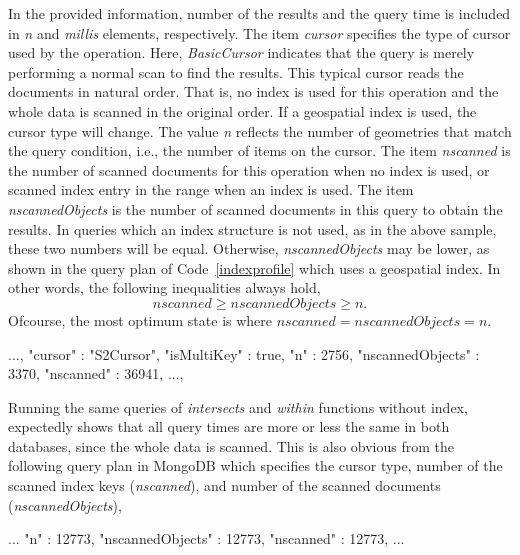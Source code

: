 \documentclass[a4paper,12pt]{article}
\begin{document}
In the provided information, number of the results and the query time is included in \textit{n} and \textit{millis} elements, respectively. The item \textit{cursor} specifies the type of cursor used by the operation. Here, \textit{BasicCursor} indicates that the query is merely performing a normal scan to find the results. This typical cursor reads the documents in natural order. That is, no index is used for this operation and the whole data is scanned in the original order. If a geospatial index is used, the cursor type will change. The value \textit{n} reflects the number of geometries that match the query condition, i.e., the number of items on the cursor. The item \textit{nscanned} is the number of scanned documents for this operation when no index is used, or scanned index entry in the range when an index is used. The item \textit{nscannedObjects} is the number of scanned documents in this query to obtain the results. In queries which an index structure is not used, as in the above sample, these two numbers will be equal. Otherwise, \textit{nscannedObjects} may be lower, as shown in the query plan of Code~\ref{indexprofile} which uses a geospatial index. 
In other words, the following inequalities always hold,
$$nscanned\geq nscannedObjects\geq n.$$ 
Ofcourse, the most optimum state is where $nscanned=nscannedObjects=n$. 
\vspace{10px}
\begin{fakeXML}[label=indexprofile,caption=Query profile in MongoDB when the related query uses geospatial index]
...,
"cursor" : "S2Cursor",
"isMultiKey" : true,
"n" : 2756,
"nscannedObjects" : 3370,
"nscanned" : 36941,
...,
\end{fakeXML}
\vspace{10px}


Running the same queries of \textit{intersects} and \textit{within} functions without index, expectedly shows that all query times are more or less the same in both databases, since the whole data is scanned. This is also obvious from the following query plan in MongoDB which specifies the cursor type, number of the scanned index keys (\textit{nscanned}), and number of the scanned documents (\textit{nscannedObjects}),
\vspace{10px}
\begin{fakeJSON}
...
"n" : 12773,
"nscannedObjects" : 12773,
"nscanned" : 12773,
...
\end{fakeJSON}
\vspace{10px}
\end{document}
